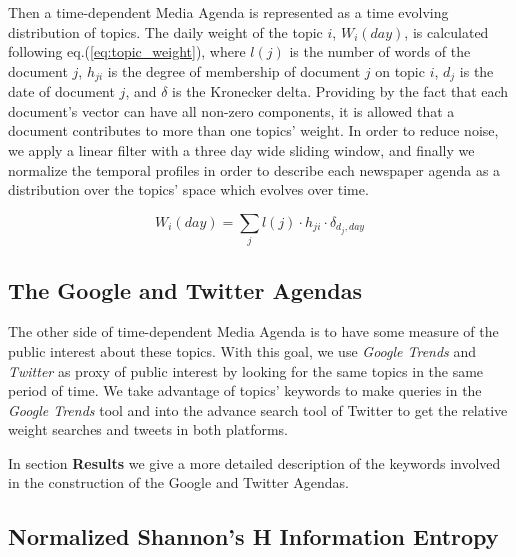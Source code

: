 \documentclass{bmcart}
\begin{document}
\par Then a time-dependent Media Agenda is represented as a time evolving distribution of topics. The daily weight of the topic $i$, $W_i(day)$, is calculated following  eq.(\ref{eq:topic_weight}), where $l(j)$ is the number of words of the document $j$, $h_{ji}$ is the degree of membership of document $j$ on topic $i$, $d_j$ is the date of document $j$, and $\delta$ is the Kronecker delta. Providing by the fact that each document's vector can have all non-zero components, it is allowed that a document contributes to more than one topics' weight.
In order to reduce noise, we apply a linear filter with a three day wide sliding window, and finally we normalize the temporal profiles in order to describe each newspaper agenda as a distribution over the topics' space which evolves over time. 

\begin{equation}
W_i(day) = \sum_j l(j) \cdot h_{ji} \cdot \delta_{d_j,day}
\label{eq:topic_weight}
\end{equation}

\subsection*{The Google and Twitter Agendas}
 
\par The other side of time-dependent Media Agenda is to have some measure of the public interest about these topics. With this goal, we use  \emph{Google Trends} and \emph{Twitter} as proxy of public interest by  looking for the same topics  in the same period of time. We take advantage of topics' keywords to make queries in the \emph{Google Trends}  tool and  into the advance search tool of Twitter  to get the relative weight searches and tweets in both platforms.
\par In section \textbf{Results} we give a more detailed description of the keywords involved in the construction of the Google and Twitter Agendas. 

\subsection*{Normalized Shannon's H Information Entropy}
\end{document}
